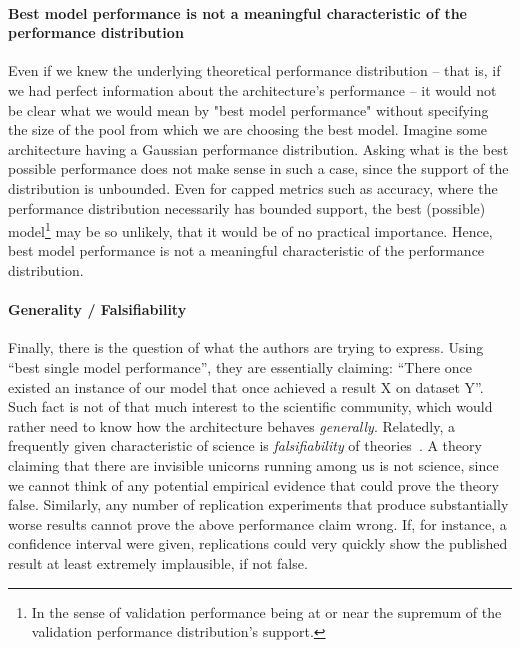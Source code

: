 \documentclass{article}
\begin{document}
\paragraph{Best model performance is not a meaningful characteristic of the performance distribution}
Even if we knew the underlying theoretical performance distribution -- that is, if we had perfect information about the architecture's performance -- it would not be clear what we would mean by "best model performance" without specifying the size of the pool from which we are choosing the best model. Imagine some architecture having a Gaussian performance distribution. Asking what is the best possible performance does not make sense in such a case, since the support of the distribution is unbounded. Even for capped metrics such as accuracy, where the performance distribution necessarily has bounded support, the best (possible) model\footnote{In the sense of validation performance being at or near the supremum of the validation performance distribution's support.} may be so unlikely, that it would be of no practical importance. Hence, best model performance is not a meaningful characteristic of the performance distribution. 


\paragraph{Generality / Falsifiability} Finally, there is the question of what the authors are trying to express. Using ``best single model performance'', they are essentially claiming:  ``There once existed an instance of our model that once achieved a result X on dataset Y''. Such fact is not of that much interest to the scientific community, which would rather need to know how the architecture behaves \emph{generally}. Relatedly, a frequently given characteristic of science is \emph{falsifiability} of theories~\citep{popper1959logic}. A theory claiming that there are invisible unicorns running among us is not science, since we cannot think of any potential empirical evidence that could prove the theory false. Similarly, any number of replication experiments that produce substantially worse results cannot prove the above performance claim wrong. If, for instance, a confidence interval were given, replications could very quickly show the published result at least extremely implausible, if not false. 
\end{document}
